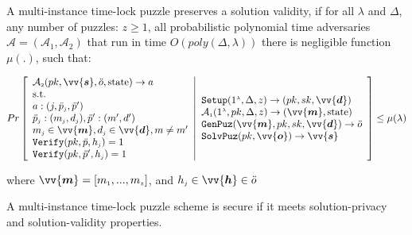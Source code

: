 \begin{definition}\label{Def::Solution-Validity}
A multi-instance time-lock puzzle preserves a   solution validity,   if  for all $\lambda$ and  $\Delta$,  any number of puzzles: $z\geq1$, all probabilistic polynomial time adversaries $\mathcal{A}=(\mathcal{A}_{\scriptscriptstyle 1},\mathcal{A}_{\scriptscriptstyle 2})$ that run in  time $O(poly(\Delta,\lambda))$ there is  negligible function $\mu(.)$, such that: 

$$ Pr\left[
    \begin{array}{l}
 \mathcal{A}_{\scriptscriptstyle 2}(pk,\vv{\bm{s}}, \ddot{o},\text{state})\rightarrow a\\ 
 
 \text{s.t.}\\ 
a:(j,\ddot{p}_{\scriptscriptstyle j} ,\ddot{p}')\\
 \ddot{p}_{\scriptscriptstyle j}: (m_{\scriptscriptstyle j},d_{\scriptscriptstyle j}), 
\ddot{p}':(m',d') \\
 m_{\scriptscriptstyle j}\in \vv{{\bm{m}}}, d_{\scriptscriptstyle j}\in\vv{{\bm{d}}},
m\neq m'\\
\mathtt {Verify}(pk,\ddot{p},h_{\scriptscriptstyle j})= 1\\
\mathtt {Verify}(pk,\ddot{p}',h_{\scriptscriptstyle j})= 1\\
\end{array} 
\middle |
\begin{array}{l}

\mathtt{Setup}(1^{\scriptscriptstyle\lambda},\Delta,z)\rightarrow (pk,sk,\vv{\bm{d}})\\
\mathcal{A}_{\scriptscriptstyle 1}(1^{\scriptscriptstyle\lambda},pk, \Delta,z)\rightarrow (\vv{{\bm{m}}},\text{state})\\

\mathtt {GenPuz}(\vv{{\bm{m}}}, pk, sk,\vv{\bm{d}})\rightarrow \ddot{o} \\
\mathtt {SolvPuz}(pk,\vv{\bm{o}})\rightarrow \vv{\bm{s}}

\end{array} 
   \right]\leq  \mu(\lambda)$$
   
where $\vv{{\bm{m}}}=[m_{\scriptscriptstyle 1},...,m_{\scriptscriptstyle z}]$, and $h_{\scriptscriptstyle j}\in \vv{\bm{h}}\in \ddot{o}$
\end{definition}


% 
\begin{definition}\label{def::C-TLP-security} A multi-instance time-lock puzzle scheme  is secure if it meets solution-privacy and solution-validity properties. 
\end{definition}



